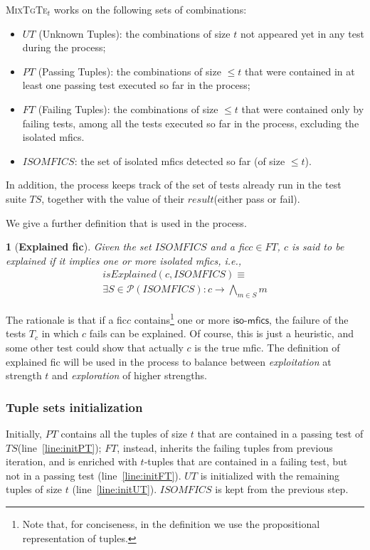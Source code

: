 \documentclass[
12pt, %
oneside, %
english, %
singlespacing, %
headsepline, %
consistentlayout, %
]{MastersDoctoralThesis} %
\newcommand{\mixt}{\textsc{MixTgTe$_t$}\xspace}
\newcommand{\fic}{\textsf{fic}\xspace}
\newcommand{\mfic}{\textsf{mfic}\xspace}
\newcommand{\mfics}{\textsf{mfics}\xspace}
\newcommand{\result}{\ensuremath{\mathit{result}}\xspace}
\newcommand{\ts}{\ensuremath{\mathit{TS}}\xspace}
\newcommand{\ft}{\ensuremath{\mathit{FT}}\xspace}
\newcommand{\ut}{\ensuremath{\mathit{UT}}\xspace}
\newcommand{\pt}{\ensuremath{\mathit{PT}}\xspace}
\newcommand{\isoMficsSet}{\ensuremath{\mathit{ISOMFICS}}\xspace}
\newcommand{\isoMfics}{\ensuremath{\textsf{iso-mfics}}\xspace}
\newcommand{\isExplained}{\ensuremath{\mathit{isExplained}}\xspace}
\newtheorem{defn}[thm]{\protect\definitionname}
\providecommand{\definitionname}{Definition}
\theoremstyle{plain}
\theoremstyle{definition}
\theoremstyle{remark}
\theoremstyle{plain}
\theoremstyle{plain}
\providecommand{\definitionname}{Definition}
\theoremstyle{remark}
\begin{document}
\mixt works on the following sets of combinations:
%
\begin{itemize}
	\item \textbf{\ut} (Unknown Tuples): the combinations of size $t$ not appeared yet in any test during the process;
	\item \textbf{\pt} (Passing Tuples): the combinations of size $\le t$ that were contained in at least one passing test executed so far in the process;
	\item \textbf{\ft} (Failing Tuples): the combinations of size $\le t$ that were contained only by failing tests, among all the tests executed so far in the process, excluding the isolated \mfics.
	\item \textbf{\isoMficsSet}: the set of isolated \mfics detected so far (of size $\le t$).
\end{itemize}
%
In addition, the process keeps track of the set of tests already run in the test suite \ts, together with the value of their \result (either pass or fail).

We give a further definition that is used in the process.

\begin{defn}[\textbf{Explained \fic}]\label{def:explainedFic}
	Given the set \isoMficsSet and a \fic $c \in \ft$, $c$ is said to be \emph{explained} if it implies one or more isolated \mfics, i.e.,
	\[
	\begin{array}{l}
	\isExplained(c, \isoMficsSet) \equiv\\
	\exists S \in \mathcal{P}(\isoMficsSet) \colon c \rightarrow \bigwedge\limits_{m \in S} m
	\end{array}
	\]
\end{defn}

The rationale is that if a \fic $c$ contains\footnote{Note that, for conciseness, in the definition we use the propositional representation of tuples.} one or more \isoMfics, the failure of the tests $T_c$ in which $c$ fails can be explained. Of course, this is just a heuristic, and some other test could show that actually $c$ is the true \mfic. The definition of explained \fic will be used in the process to balance between {\it exploitation} at strength $t$ and {\it exploration} of higher strengths.



\subsubsection{Tuple sets initialization}
Initially, \pt contains all the tuples of size $t$ that are contained in a passing test of \ts (line~\ref{line:initPT}); \ft, instead, inherits the failing tuples from previous iteration, and is enriched with $t$-tuples that are contained in a failing test, but not in a passing test (line~\ref{line:initFT}). \ut is initialized with the remaining tuples of size $t$ (line~\ref{line:initUT}). \isoMficsSet is kept from the previous step.
\end{document}
